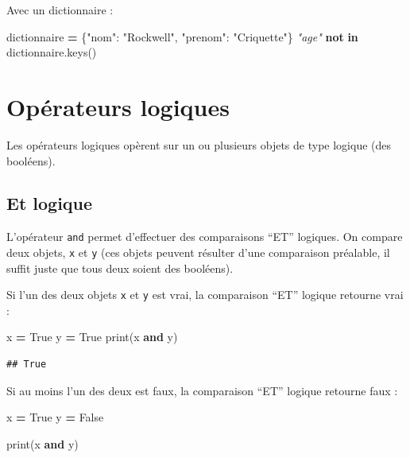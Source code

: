 \documentclass[12pt,]{book}
\newenvironment{Shaded}{\begin{snugshade}}{\end{snugshade}}
\newcommand{\KeywordTok}[1]{\textcolor[rgb]{0.13,0.29,0.53}{\textbf{#1}}}
\newcommand{\StringTok}[1]{\textcolor[rgb]{0.31,0.60,0.02}{#1}}
\newcommand{\CommentTok}[1]{\textcolor[rgb]{0.56,0.35,0.01}{\textit{#1}}}
\newcommand{\VariableTok}[1]{\textcolor[rgb]{0.00,0.00,0.00}{#1}}
\newcommand{\OperatorTok}[1]{\textcolor[rgb]{0.81,0.36,0.00}{\textbf{#1}}}
\newcommand{\BuiltInTok}[1]{#1}
\newcommand{\NormalTok}[1]{#1}
\numberwithin{equation}{section}
\numberwithin{countremarque}{section}
\begin{document}
Avec un dictionnaire :

\begin{Shaded}
\begin{Highlighting}[]
\NormalTok{dictionnaire }\OperatorTok{=}\NormalTok{ \{}\StringTok{"nom"}\NormalTok{: }\StringTok{"Rockwell"}\NormalTok{, }\StringTok{"prenom"}\NormalTok{: }\StringTok{"Criquette"}\NormalTok{\}}
\CommentTok{"age"} \KeywordTok{not} \KeywordTok{in}\NormalTok{ dictionnaire.keys()}
\end{Highlighting}
\end{Shaded}

\section{Opérateurs logiques}\label{operateurs-logiques}

Les opérateurs logiques opèrent sur un ou plusieurs objets de type
logique (des booléens).

\subsection{Et logique}\label{et-logique}

L'opérateur \texttt{and} permet d'effectuer des comparaisons ``ET''
logiques. On compare deux objets, \texttt{x} et \texttt{y} (ces objets
peuvent résulter d'une comparaison préalable, il suffit juste que tous
deux soient des booléens).

Si l'un des deux objets \texttt{x} et \texttt{y} est vrai, la
comparaison ``ET'' logique retourne vrai :

\begin{Shaded}
\begin{Highlighting}[]
\NormalTok{x }\OperatorTok{=} \VariableTok{True}
\NormalTok{y }\OperatorTok{=} \VariableTok{True}
\BuiltInTok{print}\NormalTok{(x }\KeywordTok{and}\NormalTok{ y)}
\end{Highlighting}
\end{Shaded}

\begin{lstlisting}
## True
\end{lstlisting}

Si au moins l'un des deux est faux, la comparaison ``ET'' logique
retourne faux :

\begin{Shaded}
\begin{Highlighting}[]
\NormalTok{x }\OperatorTok{=} \VariableTok{True}
\NormalTok{y }\OperatorTok{=} \VariableTok{False}

\BuiltInTok{print}\NormalTok{(x }\KeywordTok{and}\NormalTok{ y)}
\end{Highlighting}
\end{Shaded}
\end{document}
